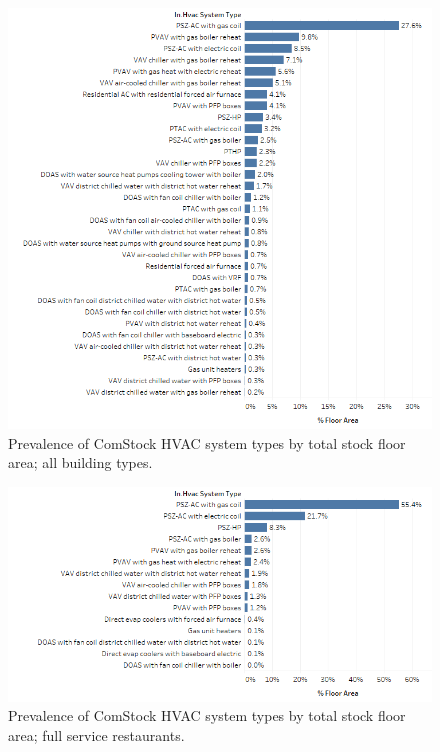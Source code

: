 
\begin{figure}
    \centering \includegraphics[width=1.0\textwidth]{figures/hvac_system_type_prevalance.png}
    \caption[HVAC system type prevalence in all building types]{Prevalence of ComStock HVAC system types by total stock floor area; all building types.}
    \label{fig:hvac_sys_type_prevalence}
\end{figure}

\begin{figure}
    \centering \includegraphics[width=1.0\textwidth]{figures/HVAC_SYS_Type_PREV_FSR.png}
    \caption[HVAC system type prevalence in full service restaurants]{Prevalence of ComStock HVAC system types by total stock floor area; full service restaurants.}
    \label{fig:hvac_sys_type_prevalence_fsr}
\end{figure}

